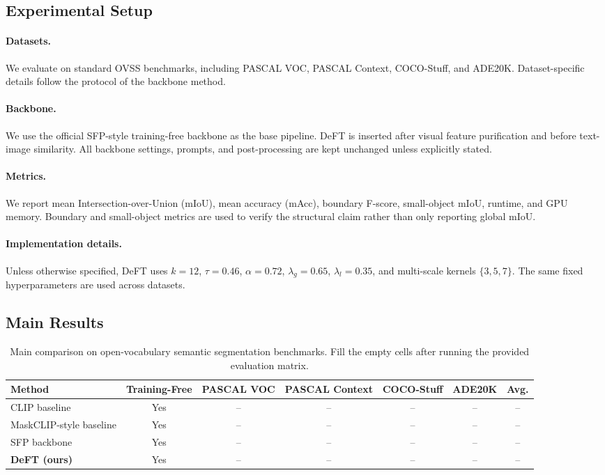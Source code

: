 \documentclass[letterpaper]{article}
\begin{document}
\subsection{Experimental Setup}

\paragraph{Datasets.}
We evaluate on standard OVSS benchmarks, including PASCAL VOC, PASCAL Context,
COCO-Stuff, and ADE20K. Dataset-specific details follow the protocol of the
backbone method.

\paragraph{Backbone.}
We use the official SFP-style training-free backbone as the base pipeline. DeFT
is inserted after visual feature purification and before text-image similarity.
All backbone settings, prompts, and post-processing are kept unchanged unless
explicitly stated.

\paragraph{Metrics.}
We report mean Intersection-over-Union (mIoU), mean accuracy (mAcc), boundary
F-score, small-object mIoU, runtime, and GPU memory. Boundary and small-object
metrics are used to verify the structural claim rather than only reporting
global mIoU.

\paragraph{Implementation details.}
Unless otherwise specified, DeFT uses $k=12$, $\tau=0.46$, $\alpha=0.72$,
$\lambda_g=0.65$, $\lambda_l=0.35$, and multi-scale kernels $\{3,5,7\}$.
The same fixed hyperparameters are used across datasets.

\subsection{Main Results}

\begin{table}[t]
\centering
\caption{Main comparison on open-vocabulary semantic segmentation benchmarks.
Fill the empty cells after running the provided evaluation matrix.}
\begin{tabular}{lcccccc}
\toprule
Method & Training-Free & PASCAL VOC & PASCAL Context & COCO-Stuff & ADE20K & Avg. \\
\midrule
CLIP baseline & Yes & -- & -- & -- & -- & -- \\
MaskCLIP-style baseline & Yes & -- & -- & -- & -- & -- \\
SFP backbone & Yes & -- & -- & -- & -- & -- \\
\textbf{DeFT (ours)} & Yes & -- & -- & -- & -- & -- \\
\bottomrule
\end{tabular}
\end{table}
\end{document}
